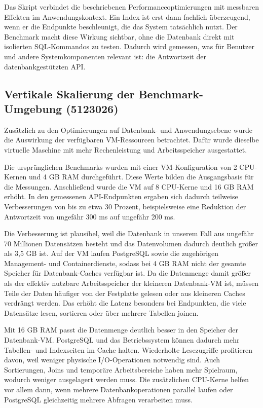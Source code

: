 Das Skript verbindet die beschriebenen Performanceoptimierungen mit messbaren Effekten im Anwendungskontext. Ein Index ist erst dann fachlich überzeugend, wenn er die Endpunkte beschleunigt, die das System tatsächlich nutzt. Der Benchmark macht diese Wirkung sichtbar, ohne die Datenbank direkt mit isolierten SQL-Kommandos zu testen. Dadurch wird gemessen, was für Benutzer und andere Systemkomponenten relevant ist: die Antwortzeit der datenbankgestützten API.

\subsection*{Vertikale Skalierung der Benchmark-Umgebung (5123026)}

Zusätzlich zu den Optimierungen auf Datenbank- und Anwendungsebene wurde die Auswirkung der verfügbaren VM-Ressourcen betrachtet. Dafür wurde dieselbe virtuelle Maschine mit mehr Rechenleistung und Arbeitsspeicher ausgestattet.

Die ursprünglichen Benchmarks wurden mit einer VM-Konfiguration von 2 CPU-Kernen und 4 GB RAM durchgeführt. Diese Werte bilden die Ausgangsbasis für die Messungen. Anschließend wurde die VM auf 8 CPU-Kerne und 16 GB RAM erhöht. In den gemessenen API-Endpunkten ergaben sich dadurch teilweise Verbesserungen von bis zu etwa 30 Prozent, beispielsweise eine Reduktion der Antwortzeit von ungefähr 300 ms auf ungefähr 200 ms.

Die Verbesserung ist plausibel, weil die Datenbank in unserem Fall aus ungefähr 70 Millionen Datensätzen besteht und das Datenvolumen dadurch deutlich größer als 3,5 GB ist. Auf der VM laufen PostgreSQL sowie die zugehörigen Management- und Containerdienste, sodass bei 4 GB RAM nicht der gesamte Speicher für Datenbank-Caches verfügbar ist. Da die Datenmenge damit größer als der effektiv nutzbare Arbeitsspeicher der kleineren Datenbank-VM ist, müssen Teile der Daten häufiger von der Festplatte gelesen oder aus kleineren Caches verdrängt werden. Das erhöht die Latenz besonders bei Endpunkten, die viele Datensätze lesen, sortieren oder über mehrere Tabellen joinen.

Mit 16 GB RAM passt die Datenmenge deutlich besser in den Speicher der Datenbank-VM. PostgreSQL und das Betriebssystem können dadurch mehr Tabellen- und Indexseiten im Cache halten. Wiederholte Lesezugriffe profitieren davon, weil weniger physische I/O-Operationen notwendig sind. Auch Sortierungen, Joins und temporäre Arbeitsbereiche haben mehr Spielraum, wodurch weniger ausgelagert werden muss. Die zusätzlichen CPU-Kerne helfen vor allem dann, wenn mehrere Datenbankoperationen parallel laufen oder PostgreSQL gleichzeitig mehrere Abfragen verarbeiten muss.

